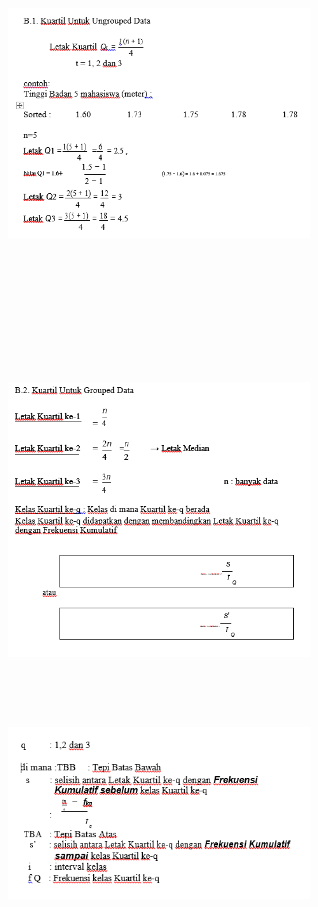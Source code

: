 \documentclass[11pt,fleqn]{book} %
\begin{document}
{\includegraphics[width = 8cm, height= 10cm]{Pictures/rizkie17.png}

\includegraphics[width = 8cm, height= 10cm]{Pictures/rizkie18.png}

\includegraphics[width = 8cm, height= 10Cm]{Pictures/rizkie19.png}

}
\end{document}
